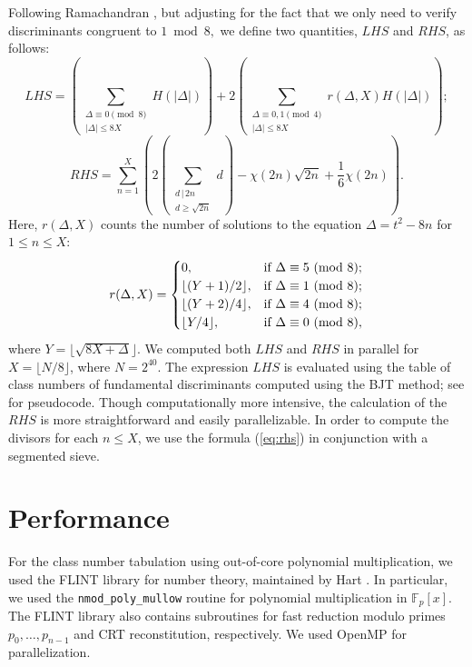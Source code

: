 \documentclass{mcom-l}
\theoremstyle{definition}
\begin{document}
Following Ramachandran \cite[Formulas~4.10, 4.11]{ramachandran}, but
adjusting for the fact that we only need to verify discriminants
congruent to $1 \bmod 8,$ we define two quantities, $LHS$ and $RHS$,
as follows:
\begin{equation} \label{eq:lhs}
LHS = \left(\sum_{\substack{\Delta \equiv 0 \pmod 8\\ |\Delta| \leq 8X}}H(|\Delta|)\right) + 2\left(\sum_{\substack{\Delta \equiv 0, 1 \pmod 4\\|\Delta| \leq 8X}}r(\Delta,X)H(|\Delta|)\right);
\end{equation}
\begin{equation} \label{eq:rhs}
RHS = \sum_{n = 1}^X\left(2\left(\sum_{\substack{d\,|\,2n\\d \geq \sqrt{2n}}} d\right) - \chi(2n)\sqrt{2n} + \frac{1}{6}\chi(2n)\right).
\end{equation}
Here, $r(\Delta, X)$ counts the number of solutions to the equation
$\Delta = t^2 - 8n$ for $1 \leq n \leq X$:
\begin{equation} \label{eq:r}
r(\Delta, X) = \begin{cases}
0, & \textnormal{if $\Delta \equiv 5$ (mod 8);}\\
\lfloor (Y+1)/2 \rfloor, & \textnormal{if $\Delta \equiv 1$ (mod 8);}\\
\lfloor (Y+2)/4 \rfloor, & \textnormal{if $\Delta \equiv 4$ (mod 8);}\\
\lfloor Y/4 \rfloor, & \textnormal{if $\Delta \equiv 0$ (mod 8)},\\
\end{cases}
\end{equation}
where $Y = \lfloor \sqrt{8X + \Delta} \rfloor$.  We computed both
$LHS$ and $RHS$ in parallel for $X = \lfloor N / 8 \rfloor$, where $N
= 2^{40}$.  The expression $LHS$ is evaluated using the table of class
numbers of fundamental discriminants computed using the BJT method;
see \cite[Algorithm~4.1]{ramachandran} for pseudocode.  Though
computationally more intensive, the calculation of the $RHS$ is more
straightforward and easily parallelizable. In order to compute the
divisors for each $n \leq X$, we use the formula (\ref{eq:rhs}) in
conjunction with a segmented sieve.

\section{Performance} \label{sec:performance}

For the class number tabulation using out-of-core polynomial
multiplication, we used the FLINT library for number theory,
maintained by Hart \cite{flint}. In particular, we used the
\texttt{nmod\_poly\_mullow} routine for polynomial multiplication in
$\mathbb F_p[x]$. The FLINT library also contains subroutines
for fast reduction modulo primes $p_0, \ldots, p_{n-1}$ and CRT
reconstitution, respectively. We used OpenMP for parallelization.
\end{document}
